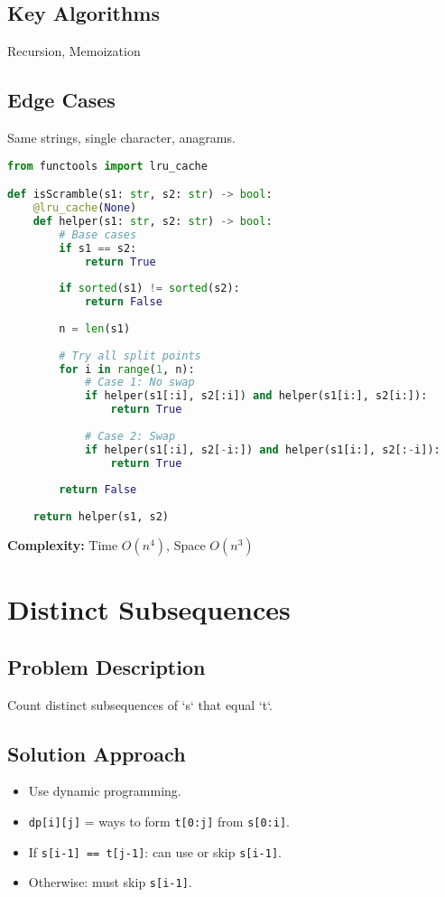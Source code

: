 \documentclass[10pt, a4paper]{article}
\begin{document}
\subsection*{Key Algorithms}
Recursion, Memoization

\subsection*{Edge Cases}
Same strings, single character, anagrams.

\begin{lstlisting}[language=Python]
from functools import lru_cache

def isScramble(s1: str, s2: str) -> bool:
    @lru_cache(None)
    def helper(s1: str, s2: str) -> bool:
        # Base cases
        if s1 == s2:
            return True
        
        if sorted(s1) != sorted(s2):
            return False
        
        n = len(s1)
        
        # Try all split points
        for i in range(1, n):
            # Case 1: No swap
            if helper(s1[:i], s2[:i]) and helper(s1[i:], s2[i:]):
                return True
            
            # Case 2: Swap
            if helper(s1[:i], s2[-i:]) and helper(s1[i:], s2[:-i]):
                return True
        
        return False
    
    return helper(s1, s2)
\end{lstlisting}
\textbf{Complexity:} Time $O(n^4)$, Space $O(n^3)$

\section{Distinct Subsequences}
\subsection*{Problem Description}
Count distinct subsequences of `s` that equal `t`.

\subsection*{Solution Approach}
\begin{itemize}
    \item Use dynamic programming.
    \item \texttt{dp[i][j]} = ways to form \texttt{t[0:j]} from \texttt{s[0:i]}.
    \item If \texttt{s[i-1] == t[j-1]}: can use or skip \texttt{s[i-1]}.
    \item Otherwise: must skip \texttt{s[i-1]}.
\end{itemize}
\end{document}
